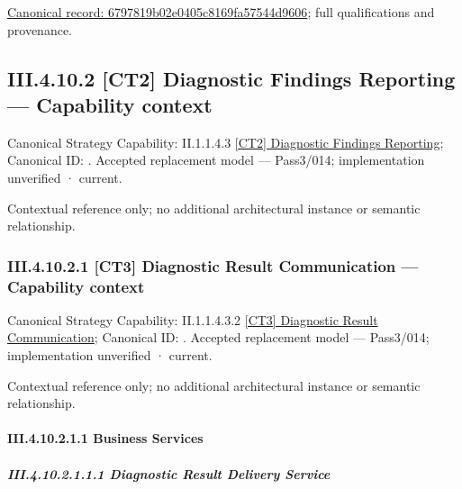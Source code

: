 {\footnotesize \href{../../../../../../../../continuum/business/business-function/6797819b02e0405c8169fa57544d9606.md}{Canonical record: 6797819b02e0405c8169fa57544d9606}; full qualifications and provenance.}\par
\subsection*{III.4.10.2 [CT2] Diagnostic Findings Reporting — Capability context}
\label{navigation:III.4.10.2}

{\small Canonical Strategy Capability: II.1.1.4.3 \hyperref[element:dc9a2828b2524ddf8bbfb6adf32926f4]{[CT2] Diagnostic Findings Reporting}; Canonical ID: \texttt{}. Accepted replacement model — Pass3/014; implementation unverified · current.}\par
Contextual reference only; no additional architectural instance or semantic relationship.\par
\subsubsection*{III.4.10.2.1 [CT3] Diagnostic Result Communication — Capability context}
\label{navigation:III.4.10.2.1}

{\small Canonical Strategy Capability: II.1.1.4.3.2 \hyperref[element:1eb70d951f164ed8a0b75ce1704b9083]{[CT3] Diagnostic Result Communication}; Canonical ID: \texttt{}. Accepted replacement model — Pass3/014; implementation unverified · current.}\par
Contextual reference only; no additional architectural instance or semantic relationship.\par
\paragraph*{III.4.10.2.1.1 Business Services}
\label{navigation:III.4.10.2.1.1}

\subparagraph*{III.4.10.2.1.1.1 Diagnostic Result Delivery Service}
\label{navigation:III.4.10.2.1.1.1}


